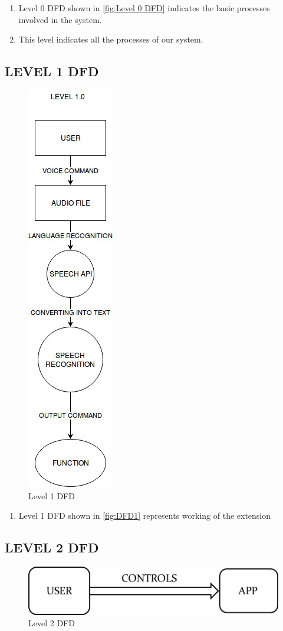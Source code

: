 \documentclass[12pt]{report} %
\begin{document}
\begin{enumerate}
	\item Level 0 DFD shown in \autoref{fig:Level 0 DFD} indicates the basic processes involved in the system.
	\item This level indicates all the processes of our system.
\end{enumerate}

\subsection{LEVEL 1 DFD}
\label{subsec:LEVEL 1 DFD}
\begin{figure}[h]
	\centering
	\includegraphics[width=0.5\linewidth, height=.8\linewidth]{figures/DFD1.jpg}
	\caption{Level 1 DFD}
	\label{fig:DFD1}
\end{figure}

\begin{enumerate}
	\item Level 1 DFD shown in \autoref{fig:DFD1} represents working of the extension
\end{enumerate}

\subsection{LEVEL 2 DFD}
\label{subsec:LEVEL 2 DFD}
\begin{figure}[h]
	\centering
	\includegraphics[width=0.5\linewidth]{figures/DFD2.png}
	\caption{Level 2 DFD}
	\label{fig:DFD2}
\end{figure}
\end{document}
